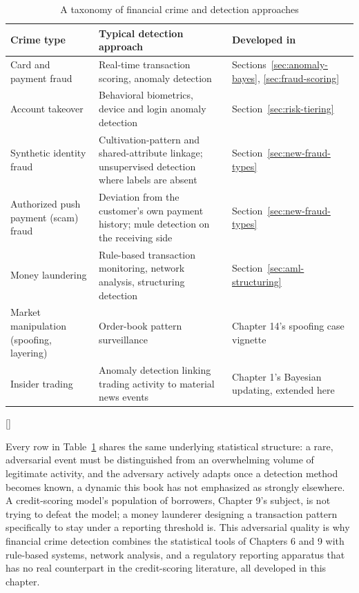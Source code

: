 \documentclass[../ai_in_finance]{subfiles}
\begin{document}
\begin{table}[htbp]
\centering
\begin{lrbox}{\bookmeasuredbox}
\begin{tabular}{p{2.8cm}p{5.6cm}p{4.0cm}}
\toprule
Crime type & Typical detection approach & Developed in \\
\midrule
Card and payment fraud & Real-time transaction scoring, anomaly detection & Sections~\ref{sec:anomaly-bayes}, \ref{sec:fraud-scoring} \\
Account takeover & Behavioral biometrics, device and login anomaly detection & Section~\ref{sec:risk-tiering} \\
Synthetic identity fraud & Cultivation-pattern and shared-attribute linkage; unsupervised detection where labels are absent & Section~\ref{sec:new-fraud-types} \\
Authorized push payment (scam) fraud & Deviation from the customer's own payment history; mule detection on the receiving side & Section~\ref{sec:new-fraud-types} \\
Money laundering & Rule-based transaction monitoring, network analysis, structuring detection & Section~\ref{sec:aml-structuring} \\
Market manipulation (spoofing, layering) & Order-book pattern surveillance & Chapter 14's spoofing case vignette \\
Insider trading & Anomaly detection linking trading activity to material news events & Chapter 1's Bayesian updating, extended here \\
\bottomrule
\end{tabular}
\end{lrbox}
\ifdim\wd\bookmeasuredbox<0.65\linewidth
\setlength{\bookcapwidth}{0.65\linewidth}
\else
\setlength{\bookcapwidth}{\wd\bookmeasuredbox}
\fi
{}[\bookcapwidth]{
\usebox{\bookmeasuredbox}
}{
\caption{A taxonomy of financial crime and detection approaches}
\label{tab:crime_taxonomy}
}
\end{table}

Every row in Table~\ref{tab:crime_taxonomy} shares the same underlying statistical structure: a rare, adversarial event must be distinguished from an overwhelming volume of legitimate activity, and the adversary actively adapts once a detection method becomes known, a dynamic this book has not emphasized as strongly elsewhere. A credit-scoring model's population of borrowers, Chapter 9's subject, is not trying to defeat the model; a money launderer designing a transaction pattern specifically to stay under a reporting threshold is. This adversarial quality is why financial crime detection combines the statistical tools of Chapters 6 and 9 with rule-based systems, network analysis, and a regulatory reporting apparatus that has no real counterpart in the credit-scoring literature, all developed in this chapter.
\end{document}
